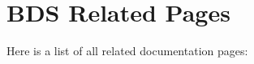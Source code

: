 \section{BDS Related Pages}
Here is a list of all related documentation pages:\begin{CompactList}
\item {}

\end{CompactList}
